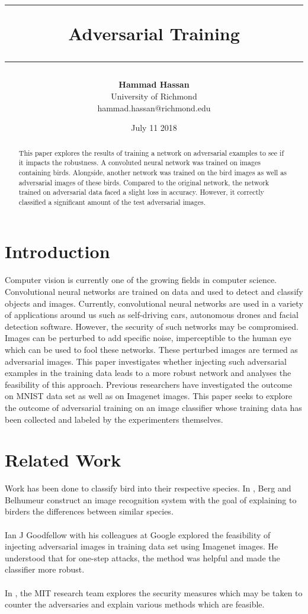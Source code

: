 \documentclass[11pt]{article}
\title {\vspace{-3cm}
		\rule{\textwidth}{2.0pt}
		\textbf{Adversarial Training}
		\rule{\textwidth}{0.5pt}
}
\author{
  \textbf{Hammad Hassan} \\
  University of Richmond \\
  hammad.hassan@richmond.edu
}
\date{July 11 2018}
\begin{document}
\maketitle
\begin{abstract}
  This paper explores the results of training a network on adversarial examples to see if it impacts the robustness. A convoluted neural network was trained on images containing birds. Alongside, another network was trained on the bird images as well as adversarial images of these birds. Compared to the original network, the network trained on adversarial data faced a slight loss in accuracy. However, it correctly classified a significant amount of the test adversarial images. 
\end{abstract}


\section{Introduction}
Computer vision is currently one of the growing fields in computer science. Convolutional neural networks are trained on data and used to detect and classify objects and images. Currently, convolutional neural networks are used in a variety of applications around us such as self-driving cars, autonomous drones and facial detection software. However, the security of such networks may be compromised. Images can be perturbed to add specific noise, imperceptible to the human eye which can be used to fool these networks. These perturbed images are termed as adversarial images. This paper investigates whether injecting such adversarial examples in the training data leads to a more robust network and analyses the feasibility of this approach. Previous researchers have investigated the outcome on MNIST data set as well as on Imagenet images. This paper seeks to explore the outcome of adversarial training on an image classifier whose training data has been collected and labeled by the experimenters themselves. 


\section{Related Work}

Work has been done to classify bird into their respective species. In \cite{berg2013you}, Berg and Belhumeur construct an image recognition
system with the goal of explaining to birders the differences between similar species. \\ \\
Ian J Goodfellow with his colleagues at Google \cite{kurakin2016adversarial} explored the feasibility of injecting adversarial images in training data set using Imagenet images. He understood that for one-step attacks, the method was helpful and made the classifier more robust. \\ \\
In \cite{madry2017towards}, the MIT research team explores the security measures which may be taken to counter the adversaries and explain various methods which are feasible.
\end{document}
